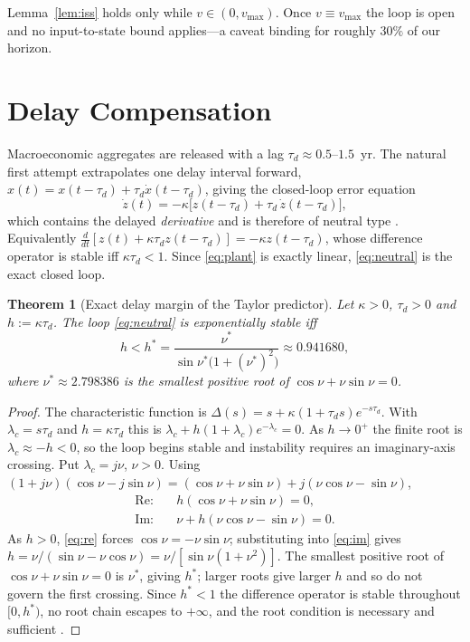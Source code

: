 \documentclass[conference,letterpaper,10pt]{IEEEtran}
\theoremstyle{plain}
\newtheorem{theorem}{Theorem}
\theoremstyle{remark}
\begin{document}
Lemma~\ref{lem:iss} holds only while $v\in(0,v_{\max})$. Once
$v\equiv v_{\max}$ the loop is open and no input-to-state bound
applies---a caveat binding for roughly $30\%$ of our horizon.

\section{Delay Compensation}
\label{sec:delay}
Macroeconomic aggregates are released with a lag
$\tau_d\approx0.5$--$1.5$~yr. The natural first attempt extrapolates
one delay interval forward,
$\hat{x}(t)=x(t-\tau_d)+\tau_d\dot{x}(t-\tau_d)$, giving the
closed-loop error equation
\begin{equation}
\label{eq:neutral}
    \dot{z}(t) = -\kappa\big[z(t-\tau_d) + \tau_d\,\dot{z}(t-\tau_d)\big],
\end{equation}
which contains the delayed \emph{derivative} and is therefore of
neutral type \cite{hale1993}. Equivalently
$\frac{d}{dt}[z(t)+\kappa\tau_d z(t-\tau_d)]=-\kappa z(t-\tau_d)$,
whose difference operator is stable iff $\kappa\tau_d<1$. Since
\eqref{eq:plant} is exactly linear, \eqref{eq:neutral} is the exact
closed loop.

\begin{theorem}[Exact delay margin of the Taylor predictor]
\label{thm:taylor}
Let $\kappa>0$, $\tau_d>0$ and $h:=\kappa\tau_d$. The loop
\eqref{eq:neutral} is exponentially stable iff
\begin{equation}
    h < h^{\ast} = \frac{\nu^{\ast}}{\sin\nu^{\ast}\big(1+(\nu^{\ast})^{2}\big)}
    \approx 0.941680,
\end{equation}
where $\nu^{\ast}\approx2.798386$ is the smallest positive root of
$\cos\nu+\nu\sin\nu=0$.
\end{theorem}
\begin{proof}
The characteristic function is
$\Delta(s)=s+\kappa(1+\tau_d s)e^{-s\tau_d}$. With $\lambda_c=s\tau_d$
and $h=\kappa\tau_d$ this is
$\lambda_c+h(1+\lambda_c)e^{-\lambda_c}=0$. As $h\to0^{+}$ the finite
root is $\lambda_c\approx-h<0$, so the loop begins stable and
instability requires an imaginary-axis crossing. Put
$\lambda_c=j\nu$, $\nu>0$. Using
$(1+j\nu)(\cos\nu-j\sin\nu)=(\cos\nu+\nu\sin\nu)+j(\nu\cos\nu-\sin\nu)$,
\begin{align}
    \text{Re}:&\quad h(\cos\nu+\nu\sin\nu)=0, \label{eq:re}\\
    \text{Im}:&\quad \nu+h(\nu\cos\nu-\sin\nu)=0. \label{eq:im}
\end{align}
As $h>0$, \eqref{eq:re} forces $\cos\nu=-\nu\sin\nu$; substituting into
\eqref{eq:im} gives $h=\nu/(\sin\nu-\nu\cos\nu)=\nu/[\sin\nu(1+\nu^{2})]$.
The smallest positive root of $\cos\nu+\nu\sin\nu=0$ is $\nu^\ast$,
giving $h^\ast$; larger roots give larger $h$ and so do not govern the
first crossing. Since $h^\ast<1$ the difference operator is stable
throughout $[0,h^\ast)$, no root chain escapes to $+\infty$, and the
root condition is necessary and sufficient \cite{hale1993,michiels2007}.
\end{proof}
\end{document}
